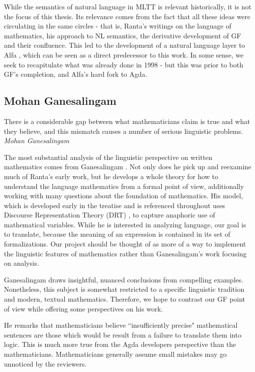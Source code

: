 While the semantics of natural language in MLTT is relevant historically, it is
not the focus of this thesis. Its relevance comes from the fact that all these
ideas were circulating in the same circles - that is, Ranta's writings on the
language of mathematics, his approach to NL semantics, the derivative
development of GF and their confluence. This led to the development of a natural
language layer to Alfa \cite{alfaGF}, which can be seen as a direct predecessor
to this work. In some sense, we seek to recapitulate what was already done in
1998 - but this was prior to both GF's completion, and Alfa's hard fork to Agda.

\subsection{Mohan Ganesalingam}

\begin{displayquote}
There is a considerable gap between what mathematicians claim is true and what
they believe, and this mismatch causes a number of serious linguistic problems. 
\emph{Mohan Ganesalingam} \cite{ganesalingam2013language}
\end{displayquote}

The most substantial analysis of the linguistic perspective on written
mathematics comes from Ganesalingam \cite{ganesalingam2013language}. Not only
does he pick up and reexamine much of Ranta's early work, but he develops a
whole theory for how to understand the language mathematics from a formal point
of view, additionally working with many questions about the foundation of
mathematics. His model, which is developed early in the treatise and is
referenced throughout uses Discourse Representation Theory (DRT)
\cite{kamp2011discourse}, to capture anaphoric use of mathematical variables.
While he is interested in analyzing language, our goal is to translate, because
the meaning of an expression is contained in its set of formalizations. Our
project should be thought of as more of a way to implement the linguistic
features of mathematics rather than Ganesalingam's work focusing on analysis.

Ganesalingam draws insightful, nuanced conclusions from compelling examples.
Nonetheless, this subject is somewhat restricted to a specific linguistic
tradition and modern, textual mathematics. Therefore, we hope to 
contrast our GF point of view while offering some perspectives on
his work.

He remarks that mathematicians believe ``insufficiently precise" mathematical
sentences are those which would be result from a failure to translate them into
logic. This is much more true from the Agda developers perspective than the
mathematicians. Mathematicians generally assume small mistakes may go unnoticed
by the reviewers.

